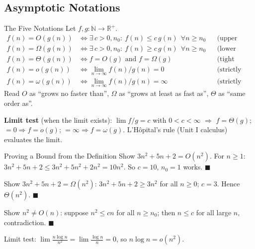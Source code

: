 \documentclass[11pt,a4paper]{article}
\begin{document}
\subsection{Asymptotic Notations}

\begin{formulabox}{The Five Notations}
Let $f, g: \mathbb{N} \to \mathbb{R}^+$.
\begin{align}
f(n) = O(g(n)) &\iff \exists\, c > 0, n_0:\ f(n) \le c\,g(n)\ \ \forall n \ge n_0 && \text{(upper bound)} \\
f(n) = \Omega(g(n)) &\iff \exists\, c > 0, n_0:\ f(n) \ge c\,g(n)\ \ \forall n \ge n_0 && \text{(lower bound)} \\
f(n) = \Theta(g(n)) &\iff f = O(g) \text{ and } f = \Omega(g) && \text{(tight bound)} \\
f(n) = o(g(n)) &\iff \lim_{n\to\infty} f(n)/g(n) = 0 && \text{(strictly slower)} \\
f(n) = \omega(g(n)) &\iff \lim_{n\to\infty} f(n)/g(n) = \infty && \text{(strictly faster)}
\end{align}
Read $O$ as ``grows no faster than'', $\Omega$ as ``grows at least as fast as'', $\Theta$ as ``same order as''.

\textbf{Limit test} (when the limit exists): $\lim f/g = c$ with $0 < c < \infty$ $\Rightarrow$ $f = \Theta(g)$; $= 0 \Rightarrow f = o(g)$; $= \infty \Rightarrow f = \omega(g)$. L'H\^opital's rule (Unit I calculus) evaluates the limit.
\end{formulabox}

\begin{worked}{Proving a Bound from the Definition}
Show $3n^2 + 5n + 2 = O(n^2)$. For $n \ge 1$: $3n^2 + 5n + 2 \le 3n^2 + 5n^2 + 2n^2 = 10n^2$. So $c = 10$, $n_0 = 1$ works. $\blacksquare$

Show $3n^2 + 5n + 2 = \Omega(n^2)$: $3n^2 + 5n + 2 \ge 3n^2$ for all $n \ge 0$; $c = 3$. Hence $\Theta(n^2)$. $\blacksquare$

Show $n^2 \ne O(n)$: suppose $n^2 \le cn$ for all $n \ge n_0$; then $n \le c$ for all large $n$, contradiction. $\blacksquare$

Limit test: $\lim \frac{n \log n}{n^2} = \lim \frac{\log n}{n} = 0$, so $n \log n = o(n^2)$.
\end{worked}
\end{document}
